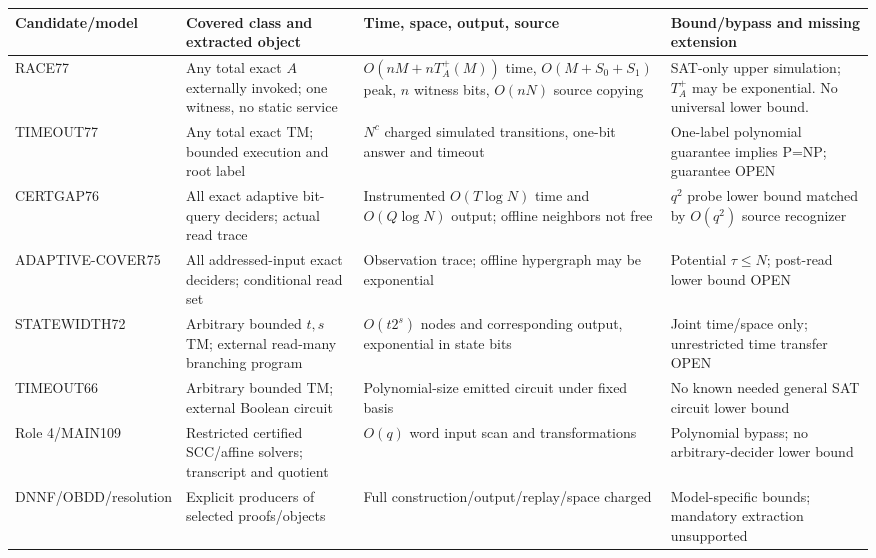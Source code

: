 \documentclass[11pt]{article}
\begin{document}
\begin{longtable}{p{.19\linewidth}p{.25\linewidth}p{.28\linewidth}p{.20\linewidth}}
\toprule Candidate/model & Covered class and extracted object & Time, space, output, source & Bound/bypass and missing extension\\\midrule\endhead
RACE77 & Any total exact $A$ externally invoked; one witness, no static service & $O(nM+nT_A^+(M))$ time, $O(M+S_0+S_1)$ peak, $n$ witness bits, $O(nN)$ source copying & SAT-only upper simulation; $T_A^+$ may be exponential. No universal lower bound.\\
TIMEOUT77 & Any total exact TM; bounded execution and root label & $N^c$ charged simulated transitions, one-bit answer and timeout & One-label polynomial guarantee implies P=NP; guarantee OPEN\\
CERTGAP76 & All exact adaptive bit-query deciders; actual read trace & Instrumented $O(T\log N)$ time and $O(Q\log N)$ output; offline neighbors not free & $q^2$ probe lower bound matched by $O(q^2)$ source recognizer\\
ADAPTIVE-COVER75 & All addressed-input exact deciders; conditional read set & Observation trace; offline hypergraph may be exponential & Potential $\tau\le N$; post-read lower bound OPEN\\
STATEWIDTH72 & Arbitrary bounded $t,s$ TM; external read-many branching program & $O(t2^s)$ nodes and corresponding output, exponential in state bits & Joint time/space only; unrestricted time transfer OPEN\\
TIMEOUT66 & Arbitrary bounded TM; external Boolean circuit & Polynomial-size emitted circuit under fixed basis & No known needed general SAT circuit lower bound\\
Role 4/MAIN109 & Restricted certified SCC/affine solvers; transcript and quotient & $O(q)$ word input scan and transformations & Polynomial bypass; no arbitrary-decider lower bound\\
DNNF/OBDD/resolution & Explicit producers of selected proofs/objects & Full construction/output/replay/space charged & Model-specific bounds; mandatory extraction unsupported\\
\bottomrule
\end{longtable}\normalsize
\end{document}

